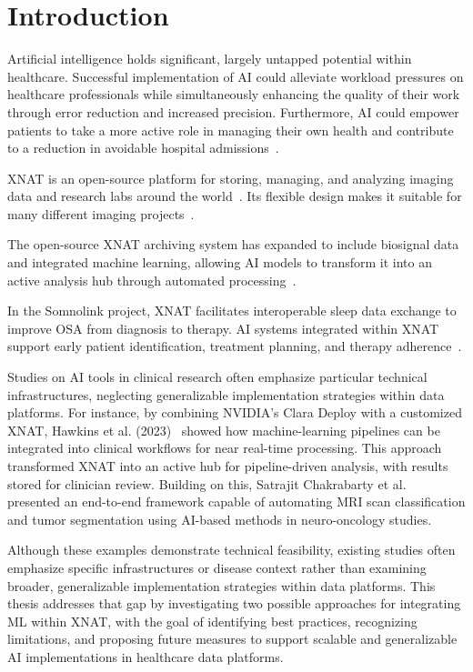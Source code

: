 

\chapter{Introduction}

Artificial intelligence holds significant, largely untapped potential within healthcare. Successful implementation of \ac{AI} could alleviate workload pressures on healthcare professionals while simultaneously enhancing the quality of their work through error reduction and increased precision. Furthermore, AI could empower patients to take a more active role in managing their own health and contribute to a reduction in avoidable hospital admissions~\cite{aung_promise_2021}.


XNAT is an open-source platform for storing, managing, and analyzing imaging data and research labs around the world~\cite{xnat_implemetation.php}. Its flexible design makes it suitable for many different imaging projects~\cite{xnat_about}.


The open-source XNAT archiving system has expanded to include biosignal data and integrated machine learning, allowing AI models to transform it into an active analysis hub through automated processing~\cite{marcus_extensible_2007}.

In the Somnolink project, XNAT facilitates interoperable sleep data exchange to improve \ac{OSA} from diagnosis to therapy. AI systems integrated within XNAT support early patient identification, treatment planning, and therapy  adherence~\cite{SOMNOLINK}.

Studies on AI tools in clinical research often emphasize particular technical infrastructures, neglecting generalizable implementation strategies within data platforms. For instance, by combining NVIDIA’s Clara Deploy with a customized XNAT, Hawkins et al. (2023)~\cite{hawkins_implementation_2023} showed how machine-learning pipelines can be integrated into clinical workflows for near real-time processing. This approach transformed XNAT into an active hub for pipeline-driven analysis, with results stored for clinician review. Building on this, Satrajit Chakrabarty et al.~\cite{chakrabarty_deep_2023} presented an end-to-end framework capable of automating \ac{MRI} scan classification and tumor segmentation using AI-based methods in neuro-oncology studies.

Although these examples demonstrate technical feasibility, existing studies often emphasize specific infrastructures or disease context rather than examining broader, generalizable implementation strategies within data platforms. This thesis addresses that gap by investigating two possible approaches for integrating \ac{ML} within XNAT, with the goal of identifying best practices, recognizing limitations, and proposing future measures to support scalable and generalizable AI implementations in healthcare data platforms.

